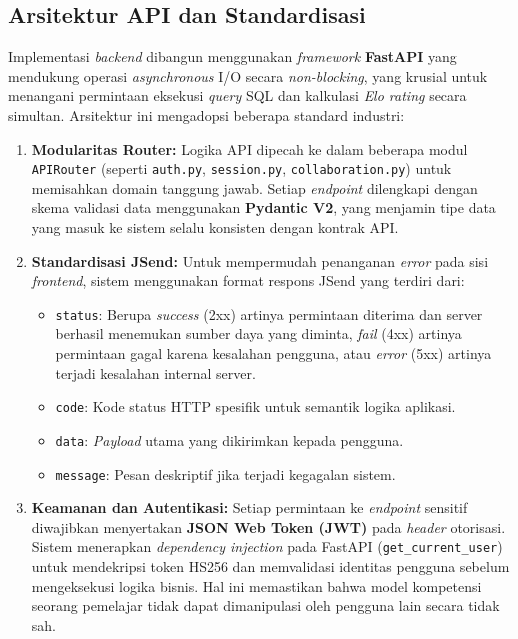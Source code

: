 \subsection{Arsitektur API dan Standardisasi}
Implementasi \textit{backend} dibangun menggunakan \textit{framework} \textbf{FastAPI} yang mendukung operasi \textit{asynchronous} I/O secara \textit{non-blocking}, yang krusial untuk menangani permintaan eksekusi \textit{query} SQL dan kalkulasi \textit{Elo rating} secara simultan. Arsitektur ini mengadopsi beberapa standard industri:

\begin{enumerate}
    \item \textbf{Modularitas Router:} Logika API dipecah ke dalam beberapa modul \linebreak \texttt{APIRouter} (seperti \texttt{auth.py}, \texttt{session.py}, \texttt{collaboration.py}) untuk memisahkan domain tanggung jawab. Setiap \textit{endpoint} dilengkapi dengan skema validasi data menggunakan \textbf{Pydantic V2}, yang menjamin tipe data yang masuk ke sistem selalu konsisten dengan kontrak API.
    \item \textbf{Standardisasi JSend:} Untuk mempermudah penanganan \textit{error} pada sisi \textit{frontend}, sistem menggunakan format respons JSend yang terdiri dari:
    \begin{itemize}
        \item \texttt{status}: Berupa \textit{success} (2xx) artinya permintaan diterima dan server berhasil menemukan sumber daya yang diminta, \textit{fail} (4xx) artinya permintaan gagal karena kesalahan pengguna, atau \textit{error} (5xx) artinya terjadi kesalahan internal server.
        \item \texttt{code}: Kode status HTTP spesifik untuk semantik logika aplikasi.
        \item \texttt{data}: \textit{Payload} utama yang dikirimkan kepada pengguna.
        \item \texttt{message}: Pesan deskriptif jika terjadi kegagalan sistem.
    \end{itemize}
    \item \textbf{Keamanan dan Autentikasi:} Setiap permintaan ke \textit{endpoint} sensitif diwajibkan menyertakan \textbf{JSON Web Token (JWT)} pada \textit{header} otorisasi. Sistem menerapkan \textit{dependency injection} pada FastAPI (\texttt{get\_current\_user}) untuk mendekripsi token HS256 dan memvalidasi identitas pengguna sebelum mengeksekusi logika bisnis. Hal ini memastikan bahwa model kompetensi seorang pemelajar tidak dapat dimanipulasi oleh pengguna lain secara tidak sah.
\end{enumerate}

